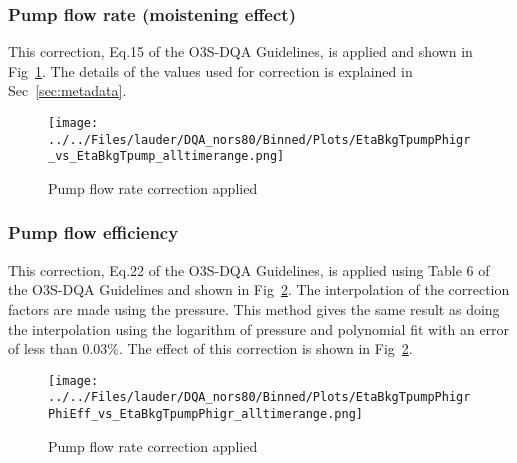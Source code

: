                 \subsubsection{Pump flow rate (moistening effect)}
    This correction, Eq.15 of the O3S-DQA Guidelines, is applied and shown in Fig~\ref{fig:pf_ptu}. The details of the values used for
    correction is explained in Sec~\ref{sec:metadata}.
%
                        \begin{figure}
        \centering
\texttt{[image: ../../Files/lauder/DQA\_nors80/Binned/Plots/EtaBkgTpumpPhigr\_vs\_EtaBkgTpump\_alltimerange.png]}
    \caption{Pump flow rate correction applied}
            \label{fig:pf_ptu}
    \end{figure}
%
                   \subsubsection{Pump flow efficiency}
    This correction, Eq.22 of the O3S-DQA Guidelines, is applied using Table 6 of the O3S-DQA Guidelines and shown in Fig~\ref{fig:pf_eff}.
The interpolation of the correction factors are made using the pressure. This method gives the same result as doing the interpolation using the logarithm of pressure
and polynomial fit with an error of less than $0.03\%$. The effect of this correction is shown in Fig~\ref{fig:pf_eff}.

                        \begin{figure}
        \centering
\texttt{[image: ../../Files/lauder/DQA\_nors80/Binned/Plots/EtaBkgTpumpPhigrPhiEff\_vs\_EtaBkgTpumpPhigr\_alltimerange.png]}
    \caption{Pump flow rate correction applied}
            \label{fig:pf_eff}
    \end{figure}
%

